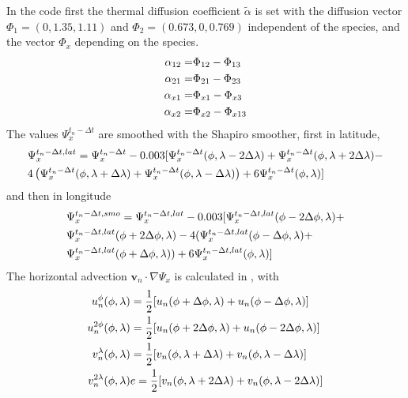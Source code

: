 In the code first the thermal diffusion coefficient $\tilde{\alpha}$
is set with the diffusion vector $\Phi_1 = (0,1.35,1.11)$ and
$\Phi_2 = (0.673, 0,0.769)$ independent of the species, and the
vector $\Phi_x$ depending on the species.
%
\begin{align}
  \alpha_{12} = & \Phi_{12}-\Phi_{13} \notag \\
  \alpha_{21} = & \Phi_{21}-\Phi_{23} \notag \\
  \alpha_{x1} = & \Phi_{x1}-\Phi_{x3} \notag \\
  \alpha_{x2} = & \Phi_{x2}-\Phi_{x13}
\end{align}
%
The values $\Psi_x^{t_n-\Delta t}$ are smoothed with the Shapiro
smoother, first in latitude,
%
\begin{align}
  {}&\Psi_x^{t_n-\Delta t,lat} = \Psi_x^{t_n-\Delta t} - 0.003[
   \Psi_x^{t_n-\Delta t}(\phi,\lambda-2 \Delta \lambda)+
   \Psi_x^{t_n-\Delta t}(\phi,\lambda+2 \Delta \lambda)- \notag \\
   {} & 4\left(
   \Psi_x^{t_n-\Delta t}(\phi,\lambda+\Delta \lambda)+
   \Psi_x^{t_n-\Delta t}(\phi,\lambda-\Delta \lambda)
   \right)+6
   \Psi_x^{t_n-\Delta t}(\phi,\lambda)]
\end{align}
%
 and then in longitude
%
\begin{align}
  {} & \Psi_x^{t_n-\Delta t,smo} =\Psi_x^{t_n-\Delta t,lat} - 0.003[
   \Psi_x^{t_n-\Delta t,lat}(\phi-2\Delta \phi,\lambda)+ \notag \\
   {} & \Psi_x^{t_n-\Delta t,lat}(\phi+2\Delta \phi,\lambda)-
   4 (
   \Psi_x^{t_n-\Delta t,lat}(\phi-\Delta \phi,\lambda)+ \notag \\
   {} & \Psi_x^{t_n-\Delta t,lat}(\phi+\Delta \phi,\lambda)
   )+6
   \Psi_x^{t_n-\Delta t,lat}(\phi,\lambda)]
\end{align}
%
The horizontal advection $\mathbf{v}_n \cdot \nabla \Psi_x$ is
calculated in , with
%
\begin{align}
   u_n^{\phi}(\phi,\lambda)&= \frac{1}{2}[u_n(\phi+\Delta \phi,\lambda)+ u_n(\phi-\Delta
   \phi,\lambda)] \notag \\
   u_n^{2\phi}(\phi,\lambda) &= \frac{1}{2}[u_n(\phi+2\Delta \phi,\lambda)+ u_n(\phi-2\Delta
   \phi,\lambda)] \notag \\
   v_n^{\lambda}(\phi,\lambda) &= \frac{1}{2}[v_n(\phi,\lambda+\Delta \lambda)+ v_n(\phi,\lambda-\Delta
   \lambda)] \notag \\
   v_n^{2\lambda}(\phi,\lambda)&e = \frac{1}{2}[v_n(\phi,\lambda+2\Delta \lambda)+ v_n(\phi,\lambda-2\Delta
   \lambda)]
\end{align}
